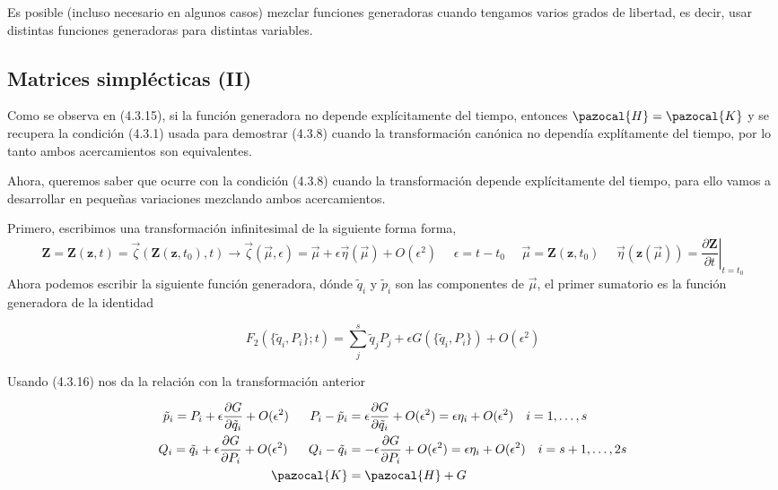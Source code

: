 Es posible (incluso necesario en algunos casos) mezclar funciones generadoras cuando tengamos varios grados de libertad, es decir, usar distintas funciones generadoras para distintas variables.
\subsection{Matrices simplécticas (II)}
Como se observa en (4.3.15), si la función generadora no depende explícitamente del tiempo, entonces $\pazocal{H} = \pazocal{K}$ y se recupera la condición (4.3.1) usada para demostrar (4.3.8) cuando la transformación canónica no dependía explítamente del tiempo, por lo tanto ambos acercamientos son equivalentes.

Ahora, queremos saber que ocurre con la condición (4.3.8) cuando la transformación depende explícitamente del tiempo, para ello vamos a desarrollar en pequeñas variaciones mezclando ambos acercamientos.

Primero, escribimos una transformación infinitesimal de la siguiente forma forma, 
\begin{equation} \label{4.2.7}
    \mathbf{Z} = \mathbf{Z}(\mathbf{z},t) = \vec{\zeta}(\mathbf{Z}(\mathbf{z},t_0),t) \rightarrow \vec{\zeta}(\vec{\mu},\epsilon) = \vec{\mu} + \epsilon \vec{\eta}(\vec{\mu}) +O(\epsilon^2) \ \ \ \ \ \ \epsilon = t-t_0 \ \ \ \ \ \ \vec{\mu} = \mathbf{Z}(\mathbf{z},t_0) \ \ \ \ \ \  \vec{\eta}(\mathbf{z}(\vec{\mu})) = \left.\frac{\partial \mathbf{Z}}{\partial t}\right|_{t=t_0}
\end{equation} 
Ahora podemos escribir la siguiente función generadora, dónde $\tilde{q}_i$ y $\tilde{p}_i$ son las componentes de $\vec{\mu}$, el primer sumatorio es la función generadora de la identidad

\vspace{-15pt}
\begin{equation} \label{4.2.7}
    F_2(\{\tilde{q}_i,P_i\};t) = \sum_j^s \tilde{q}_j P_j + \epsilon G(\{\tilde{q}_i,P_i\}) + O(\epsilon^2)
\end{equation} 

\vspace{-20pt}
Usando (4.3.16) nos da la relación con la transformación anterior

\vspace{-18pt}
\begin{equation} \label{4.2.7}
    \begin{split}
        \tilde{p}_i = P_i + \epsilon \frac{\partial G}{\partial \tilde{q}_i} + O(\epsilon^2) \ \ \ \ \ P_i-\tilde{p}_i &= \epsilon \frac{\partial G}{\partial \tilde{q}_i} + O(\epsilon^2)= \epsilon \eta_i +O(\epsilon^2)\ \ \ i = 1,\dots,s\\ 
        Q_i = \tilde{q}_i + \epsilon \frac{\partial G}{\partial P_i} + O(\epsilon^2)\ \ \ \ \ Q_i-\tilde{q}_i &= -\epsilon \frac{\partial G}{\partial P_i} + O(\epsilon^2)= \epsilon \eta_i +O(\epsilon^2)\ \ \ i = s+1,\dots,2s \\
        \pazocal{K} &= \pazocal{H} + G
    \end{split}
\end{equation} 

